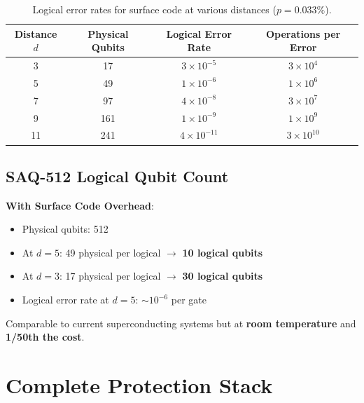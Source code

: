 \documentclass[11pt,a4paper]{article}
\theoremstyle{definition}
\begin{document}
\begin{table}[h]
\centering
\begin{tabular}{cccc}
\toprule
Distance $d$ & Physical Qubits & Logical Error Rate & Operations per Error \\
\midrule
3 & 17 & $3 \times 10^{-5}$ & $3 \times 10^4$ \\
5 & 49 & $1 \times 10^{-6}$ & $1 \times 10^6$ \\
7 & 97 & $4 \times 10^{-8}$ & $3 \times 10^7$ \\
9 & 161 & $1 \times 10^{-9}$ & $1 \times 10^9$ \\
11 & 241 & $4 \times 10^{-11}$ & $3 \times 10^{10}$ \\
\bottomrule
\end{tabular}
\caption{Logical error rates for surface code at various distances ($p = 0.033\%$).}
\end{table}

\subsection{SAQ-512 Logical Qubit Count}

\begin{engineering}
\textbf{With Surface Code Overhead}:
\begin{itemize}[noitemsep]
    \item Physical qubits: 512
    \item At $d = 5$: 49 physical per logical $\to$ \textbf{10 logical qubits}
    \item At $d = 3$: 17 physical per logical $\to$ \textbf{30 logical qubits}
    \item Logical error rate at $d = 5$: $\sim 10^{-6}$ per gate
\end{itemize}

Comparable to current superconducting systems but at \textbf{room temperature} and \textbf{1/50th the cost}.
\end{engineering}

\section{Complete Protection Stack}
\end{document}
